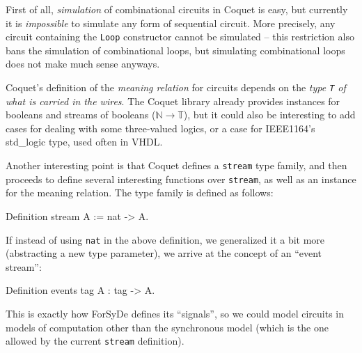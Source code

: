            First of all, \emph{simulation} of combinational circuits in Coquet is easy, but
            currently it is \emph{impossible} to simulate any form of sequential circuit. More
            precisely, any circuit containing the \texttt{Loop} constructor cannot be simulated --
            this restriction also bans the simulation of combinational loops, but simulating
            combinational loops does not make much sense anyways.

            Coquet's definition of the \emph{meaning relation} for circuits depends on the \emph{type
                \texttt{T} of what is carried in the wires}. The Coquet library already provides
            instances for booleans and streams of booleans ($ℕ \rightarrow 𝕋$), but it could also be
            interesting to add cases for dealing with some three-valued logics, or a case for
            IEEE1164's std\_logic type, used often in VHDL.

            Another interesting point is that Coquet defines a \texttt{stream} type family, and then
            proceeds to define several interesting functions over \texttt{stream}, as well as an
            instance for the meaning relation. The type family is defined as follows:

            \begin{coqcode}
        Definition stream A := nat -> A.
            \end{coqcode}

            If instead of using \texttt{nat} in the above definition, we generalized it a bit more
            (abstracting a new type parameter), we arrive at the concept of an ``event stream'':

            \begin{coqcode}
        Definition events tag A : tag -> A.
            \end{coqcode}

            This is exactly how ForSyDe defines its ``signals'', so we could model circuits in
            models of computation other than the synchronous model (which is the one allowed by the
            current \texttt{stream} definition).
